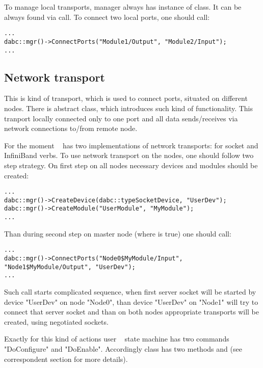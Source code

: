 To manage local transports, manager always has instance of  class.
It can be always found via  call. 
To connect two local ports, one should call:
\begin{small}
\begin{verbatim}
...
dabc::mgr()->ConnectPorts("Module1/Output", "Module2/Input");
...
\end{verbatim}     
\end{small}


\subsection{Network transport}

This is kind of transport, which is used to connect ports, situated on different nodes.
There is abstract  class, which introduces such kind of 
functionality. This tranport locally connected only to one port and all data
sends/receives via network connections to/from remote node. 

For the moment \dabc~ has two implementations of network transports: 
for socket and InfiniBand verbs.
To use network transport on the nodes, one should follow two step strategy. 
On first step on all nodes necessary devices and modules should be created:
\begin{small}
\begin{verbatim}
...
dabc::mgr()->CreateDevice(dabc::typeSocketDevice, "UserDev");
dabc::mgr()->CreateModule("UserModule", "MyModule");
...
\end{verbatim}     
\end{small}

Than during second step on master node 
(where  is true)  
one should call:
\begin{small}
\begin{verbatim}
...
dabc::mgr()->ConnectPorts("Node0$MyModule/Input", "Node1$MyModule/Output", "UserDev");
...
\end{verbatim}     
\end{small}
 
Such call starts complicated sequence, when first server socket will be started by device "UserDev" on node "Node0",
than device "UserDev" on "Node1" will try to connect that server socket and than on both nodes appropriate
transports will be created, using negotiated sockets. 

Exactly for this kind of actions user \dabc~ state machine has 
two commands "DoConfigure" and "DoEnable". Accordingly class
 has two methods  and 
(see correspondent section for more details).  


